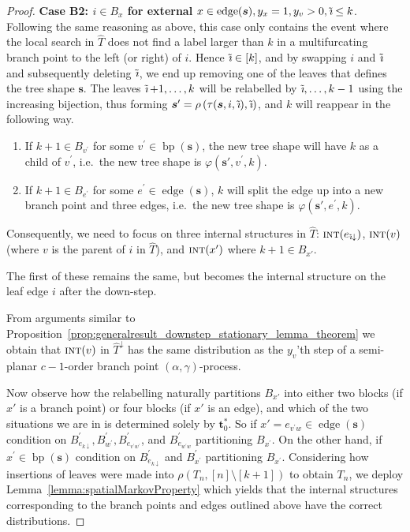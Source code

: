 \documentclass[a4paper, final]{amsart}
\theoremstyle{plain}
\theoremstyle{definition}
\newcommand{\tree}[1][t]{\boldsymbol{#1}}
\newcommand{\That}[1][T]{\widehat{#1}}
\DeclareMathOperator{\edge}{edge}
\DeclareMathOperator{\branchpoints}{bp}
\DeclareMathOperator{\intstruct}{\textsc{int}}
\DeclareMathOperator{\tildei}{\tilde{\textit{\i}}}
\begin{document}
\begin{proof}
\textbf{Case B2: $i \in B_x$ for external} $x \in \edge (\tree[s]), y_x = 1, y_v > 0, \tildei \leq k$.
  Following the same reasoning as above, this case only contains the event where the local search in $\That$ does not find a label larger than $k$ in a multifurcating branch point to the left (or right) of $i$.
  Hence $\tildei \in [k]$, and by swapping $i$ and $\tildei$ and subsequently deleting $\tildei$, we end up removing one of the leaves that defines the tree shape $\tree[s]$.
  The leaves $\tildei + 1, \ldots, k$ will be relabelled by $\tildei, \ldots, k-1$ using the increasing bijection, thus forming $\tree[s]' = \rho \left( \tau ( \tree[s], i, \tildei), \tildei \right)$, and $k$ will reappear in the following way.
  \begin{enumerate}
    \item If $k+1 \in B_{v^\prime}$ for some $v^\prime \in \branchpoints (\tree[s])$, the new tree shape will have $k$ as a child of $v^\prime$, i.e.\ the new tree shape is $\varphi \left(\tree[s]' , v^\prime, k \right)$.
    \item If $k+1 \in B_{e^\prime}$ for some $e^\prime \in \edge (\tree[s])$, $k$ will split the edge up into a new branch point and three edges, i.e.\ the new tree shape is $\varphi \left(\tree[s]' , e^\prime, k \right)$.
  \end{enumerate}
  Consequently, we need to focus on three internal structures in $\That$: $\intstruct(e_{\tildei \downarrow})$, $\intstruct(v)$ (where $v$ is the parent of $i$ in $\That$), and $\intstruct (x')$ where $k+1 \in B_{x'}$.
  
  The first of these remains the same, but becomes the internal structure on the leaf edge $i$ after the down-step.

  From arguments similar to Proposition~\ref{prop:generalresult_downstep_stationary_lemma_theorem} we obtain that $\intstruct(v)$ in $\That^\downarrow$ has the same distribution as the $y_v$'th step of a semi-planar $c-1$-order branch point $(\alpha, \gamma)$-process.

  Now observe how the relabelling naturally partitions $B_{x'}$ into either two blocks (if $x'$ is a branch point) or four blocks (if $x'$ is an edge), and which of the two situations we are in is determined solely by $\tree_0^*$.
  So if $x' = e_{v^\prime w} \in \edge(\tree[s])$ condition on $B_{e_{k \downarrow}}^\prime, B_{w^\prime}^\prime, B_{e_{v^\prime w^\prime}}^\prime$, and $B_{e_{w^\prime w}}^\prime$ partitioning $B_{x^\prime}$.
  On the other hand, if $x^\prime \in \branchpoints(\tree[s])$ condition on $B_{e_{k \downarrow}}^\prime$ and $B_{x^\prime}^\prime$ partitioning $B_{x^\prime}$.
  Considering how insertions of leaves were made into $\rho \left( T_n, [n] \setminus [k+1] \right)$ to obtain $T_n$, we deploy Lemma~\ref{lemma:spatialMarkovProperty} which yields that the internal structures corresponding to the branch points and edges outlined above have the correct distributions.


\end{proof}
\end{document}
